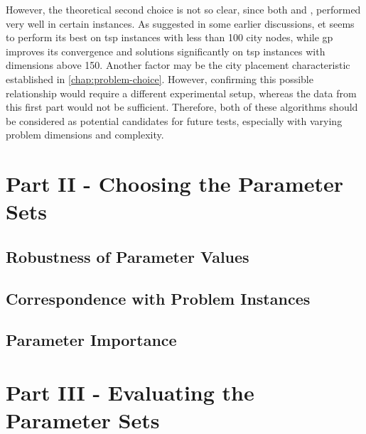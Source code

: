However, the theoretical second choice is not so clear, since both  and , performed very well in certain instances. As suggested in some earlier discussions, \gls{et} seems to perform its best on \gls{tsp} instances with less than 100 city nodes, while \gls{gp} improves its convergence and solutions significantly on \gls{tsp} instances with dimensions above 150. Another factor may be the city placement characteristic established in \cref{chap:problem-choice}. However, confirming this possible relationship would require a different experimental setup, whereas the data from this first part would not be sufficient. Therefore, both of these algorithms should be considered as potential candidates for future tests, especially with varying problem dimensions and complexity.


\section{Part II - Choosing the Parameter Sets}
\label{chap:part2}

\subsection{Robustness of Parameter Values}

\subsection{Correspondence with Problem Instances}

\subsection{Parameter Importance}


\section{Part III - Evaluating the Parameter Sets}
